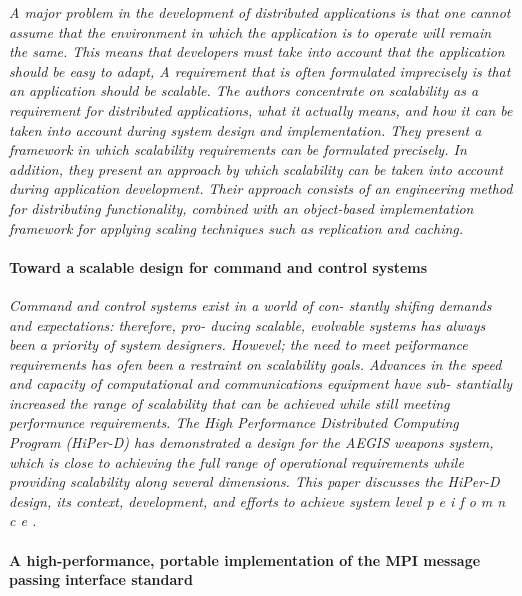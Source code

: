 \documentclass{article}
\begin{document}
\emph{A major problem in the development of distributed applications is that
one cannot assume that the environment in which the application is to operate
will remain the same. This means that developers must take into account that
the application should be easy to adapt, A requirement that is often formulated
imprecisely is that an application should be scalable. The authors concentrate
on scalability as a requirement for distributed applications, what it actually
means, and how it can be taken into account during system design and
implementation. They present a framework in which scalability requirements can
be formulated precisely. In addition, they present an approach by which
scalability can be taken into account during application development. Their
approach consists of an engineering method for distributing functionality,
combined with an object-based implementation framework for applying scaling
techniques such as replication and caching.}

\paragraph{Toward a scalable design for command and control systems}
\cite{caruso1997toward}

\emph{ Command and control systems exist in a world of con- stantly shifing
demands and expectations: therefore, pro- ducing scalable, evolvable systems
has always been a priority of system designers. Howevel; the need to meet
peiformance requirements has ofen been a restraint on scalability goals.
Advances in the speed and capacity of computational and communications
equipment have sub- stantially increased the range of scalability that can be
achieved while still meeting performunce requirements.  The High Performance
Distributed Computing Program (HiPer-D) has demonstrated a design for the AEGIS
weapons system, which is close to achieving the full range of operational
requirements while providing scalability along several dimensions. This paper
discusses the HiPer-D design, its context, development, and efforts to achieve
system level p e i f o m n c e .}

\paragraph{A high-performance, portable implementation of the MPI message passing
interface standard} \cite{gropp1996high}
\end{document}
